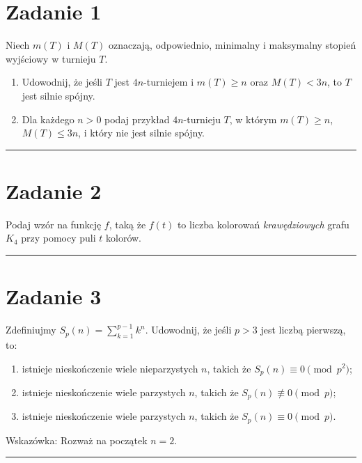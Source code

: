 \documentclass{article}
\begin{document}
\section*{Zadanie 1}
Niech $m(T)$ i $M(T)$ oznaczają, odpowiednio, minimalny i maksymalny stopień wyjściowy w turnieju $T$.
\begin{enumerate}
    \item[a.] Udowodnij, że jeśli $T$ jest $4n$-turniejem i $m(T) \geq n$ oraz $M(T) < 3n$, to $T$ jest silnie spójny.
    \item[b.] Dla każdego $n > 0$ podaj przykład $4n$-turnieju $T$, w którym $m(T) \geq n$, $M(T) \leq 3n$, i który nie jest silnie spójny.
\end{enumerate}

\vspace{0.5cm}
\noindent\rule{\textwidth}{0.5pt}
\vspace{0.5cm}

\section*{Zadanie 2}
Podaj wzór na funkcję $f$, taką że $f(t)$ to liczba kolorowań \textit{krawędziowych} grafu $K_4$ przy pomocy puli $t$ kolorów.

\vspace{0.5cm}
\noindent\rule{\textwidth}{0.5pt}
\vspace{0.5cm}

\section*{Zadanie 3}
Zdefiniujmy $S_p(n) = \sum_{k=1}^{p-1} k^n$. Udowodnij, że jeśli $p > 3$ jest liczbą pierwszą, to:
\begin{enumerate}
    \item[a.] istnieje nieskończenie wiele nieparzystych $n$, takich że $S_p(n) \equiv 0 \pmod{p^2}$;
    \item[b.] istnieje nieskończenie wiele parzystych $n$, takich że $S_p(n) \not\equiv 0 \pmod p$;
    \item[c.] istnieje nieskończenie wiele parzystych $n$, takich że $S_p(n) \equiv 0 \pmod p$.
\end{enumerate}
Wskazówka: Rozważ na początek $n = 2$.

\vspace{0.5cm}
\noindent\rule{\textwidth}{0.5pt}
\end{document}
